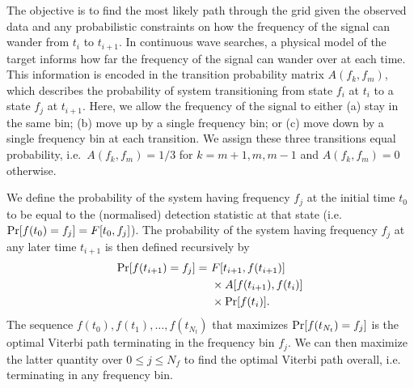 \documentclass[paper-main.tex]{subfiles}
\begin{document}
The objective is to find the most likely path through the grid given the observed data and any probabilistic constraints on how the frequency of the signal can wander from $t_i$ to $t_{i+1}$. In continuous wave searches, a physical model of the target informs how far the frequency of the signal can wander over at each time. This information is encoded in the transition probability matrix $A(f_k,f_m)$, which describes the probability of system transitioning from state $f_i$ at $t_i$ to a state $f_{j}$ at $t_{i+1}$. Here, we allow the frequency of the signal to either (a) stay in the same bin; (b) move up by a single frequency bin; or (c) move down by a single frequency bin at each transition. We assign these three transitions equal probability, i.e.\ $A(f_k,f_m)=1/3$ for $k=m+1,m,m-1$ and $A(f_k,f_m)=0$ otherwise.



We define the probability of the system having frequency $f_j$ at the initial time $t_0$ to be equal to the (normalised) detection statistic at that state (i.e.\  ${\rm Pr}[f(t_0) = f_j] = F[t_0,f_j]$).
The probability of the system having frequency $f_j$ at any later time $t_{i+1}$ is then defined recursively by
\begin{eqnarray}
{\rm Pr}[f(t_{i+1})=f_j] =~& F[t_{i+1},f(t_{i+1})] \nonumber \\
                     &\times A[f(t_{i+1}),f(t_i)]  \nonumber \\
                     &\times {\rm Pr}[f(t_i)].
\label{eqn:recursiveViterbi}
\end{eqnarray}
The sequence $f(t_0),f(t_1),\dots,f(t_{N_t})$ that maximizes ${\rm Pr}[f(t_{N_t}) = f_j]$ is the optimal Viterbi path terminating in the frequency bin $f_j$. 
We can then maximize the latter quantity over $0 \leq j \leq N_f$ to find the optimal Viterbi path overall, i.e. terminating in any frequency bin. 
\end{document}
